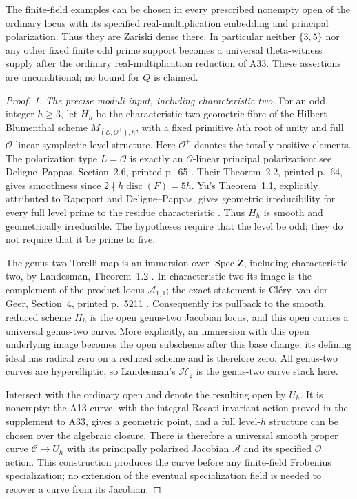 \documentclass[11pt,a4paper]{article}
\begin{document}
The finite-field examples can be chosen in every prescribed nonempty
open of the ordinary locus with its specified real-multiplication
embedding and principal polarization.  Thus they are Zariski dense
there.  In particular neither $\{3,5\}$ nor any other fixed finite odd
prime support becomes a universal theta-witness supply after the
ordinary real-multiplication reduction of A33.  These assertions are
unconditional; no bound for $Q$ is claimed.

\begin{proof}
\emph{1. The precise moduli input, including characteristic two.}
For an odd integer $h\geq3$, let $H_h$ be the characteristic-two
geometric fibre of the Hilbert--Blumenthal scheme
$M_{(\mathcal O,\mathcal O^+),h}$, with a fixed primitive $h$th root of
unity and full $\mathcal O$-linear symplectic level structure.
Here $\mathcal O^+$ denotes the totally positive elements.
The polarization type $L=\mathcal O$ is exactly an
$\mathcal O$-linear principal polarization: see Deligne--Pappas,
Section~2.6, printed p.~65 \cite{DelignePappas1994}.
Their Theorem~2.2, printed p.~64, gives smoothness since
$2\nmid h\operatorname{disc}(F)=5h$.
Yu's Theorem~1.1, explicitly attributed to Rapoport and
Deligne--Pappas, gives geometric irreducibility for every full level
prime to the residue characteristic \cite[Theorem~1.1, author
manuscript p.~2]{Yu2009HB}.  Thus $H_h$ is smooth and geometrically
irreducible.  The hypotheses require that the level be odd;
they do not require that it be prime to five.

The genus-two Torelli map is an immersion over $\operatorname{Spec}
\mathbf Z$, including characteristic two, by Landesman,
Theorem~1.2 \cite{Landesman2021Torelli}.  In characteristic two its image
is the complement of the product locus $\mathcal A_{1,1}$; the exact
statement is Cl\'ery--van der Geer, Section~4, printed p.~5211
\cite{CleryVanderGeer2022}.  Consequently its pullback to the
smooth, reduced scheme $H_h$ is the open genus-two Jacobian locus,
and this open carries a universal genus-two curve.  More explicitly,
an immersion with this open underlying image becomes the open
subscheme after this base change: its defining ideal has radical
zero on a reduced scheme and is therefore zero.
All genus-two curves are hyperelliptic, so Landesman's
$\mathcal H_2$ is the genus-two curve stack here.

Intersect with the ordinary open and denote the resulting open by
$U_h$.  It is nonempty: the A13 curve, with the integral
Rosati-invariant action proved in the supplement to A33, gives a
geometric point, and a full level-$h$ structure can be chosen over
the algebraic closure.  There is therefore a universal smooth proper
curve $\mathcal C\to U_h$ with its principally polarized Jacobian
$\mathcal A$ and its specified $\mathcal O$ action.  This construction
produces the curve before any finite-field Frobenius specialization;
no extension of the eventual specialization field is needed to
recover a curve from its Jacobian.


\end{proof}
\end{document}
